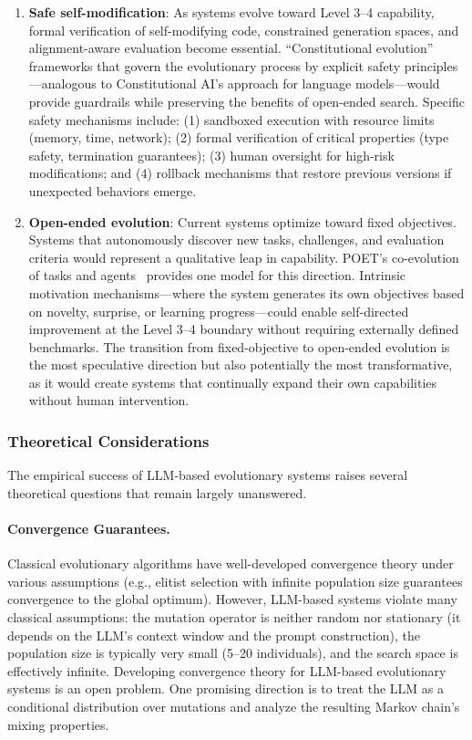 \begin{enumerate}
    \item \textbf{Safe self-modification}: As systems evolve toward Level 3--4 capability, formal verification of self-modifying code, constrained generation spaces, and alignment-aware evaluation become essential. ``Constitutional evolution'' frameworks that govern the evolutionary process by explicit safety principles---analogous to Constitutional AI's approach for language models---would provide guardrails while preserving the benefits of open-ended search. Specific safety mechanisms include: (1) sandboxed execution with resource limits (memory, time, network); (2) formal verification of critical properties (type safety, termination guarantees); (3) human oversight for high-risk modifications; and (4) rollback mechanisms that restore previous versions if unexpected behaviors emerge.

    \item \textbf{Open-ended evolution}: Current systems optimize toward fixed objectives. Systems that autonomously discover new tasks, challenges, and evaluation criteria would represent a qualitative leap in capability. POET's co-evolution of tasks and agents~\citep{wang2020poet} provides one model for this direction. Intrinsic motivation mechanisms---where the system generates its own objectives based on novelty, surprise, or learning progress---could enable self-directed improvement at the Level 3--4 boundary without requiring externally defined benchmarks. The transition from fixed-objective to open-ended evolution is the most speculative direction but also potentially the most transformative, as it would create systems that continually expand their own capabilities without human intervention.
\end{enumerate}

\subsubsection{Theoretical Considerations}

The empirical success of LLM-based evolutionary systems raises several theoretical questions that remain largely unanswered.

\paragraph{Convergence Guarantees.}
Classical evolutionary algorithms have well-developed convergence theory under various assumptions (e.g., elitist selection with infinite population size guarantees convergence to the global optimum). However, LLM-based systems violate many classical assumptions: the mutation operator is neither random nor stationary (it depends on the LLM's context window and the prompt construction), the population size is typically very small (5--20 individuals), and the search space is effectively infinite. Developing convergence theory for LLM-based evolutionary systems is an open problem. One promising direction is to treat the LLM as a conditional distribution over mutations and analyze the resulting Markov chain's mixing properties.

